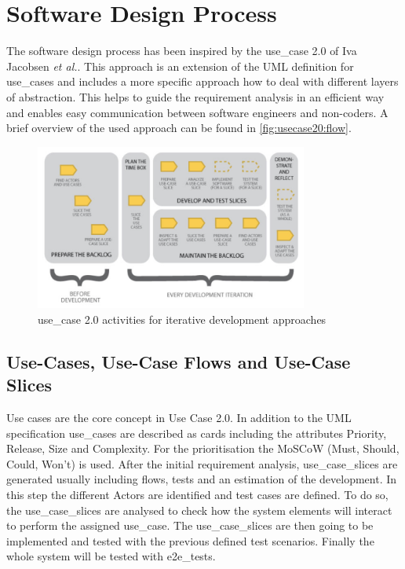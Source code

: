 \section{Software Design Process}
\label{sec:design}

The software design process has been inspired by the \gls{use_case} 2.0 \cite{jacobson2011usecase} of Iva Jacobsen \textit{et al.}. This approach is an extension of the \gls{UML} definition for \glspl{use_case} and includes a more specific approach how to deal with different layers of abstraction. This helps to guide the requirement analysis in an efficient way and enables easy communication between software engineers and non-coders. A brief overview of the used approach can be found in \autoref{fig:usecase20:flow}.

\begin{figure}[!ht]
\centering
\includegraphics[width=0.8\textwidth]{figures/uc20_flow}
\caption{\gls{use_case} 2.0 activities for iterative development approaches \cite{jacobson2011usecase}}
\label{fig:usecase20:flow}
\end{figure}


\subsection{Use-Cases, Use-Case Flows and Use-Case Slices}
Use cases are the core concept in Use Case 2.0. In addition to the \gls{UML} specification \glspl{use_case} are described as cards including the attributes Priority, Release, Size and Complexity. For the prioritisation the MoSCoW \cite{moscow} (Must, Should, Could, Won't) is used. After the initial requirement analysis, \glspl{use_case_slice} are generated usually including flows, tests and an estimation of the development. In this step the different \glspl{Actor} are identified and test cases are defined. To do so, the \glspl{use_case_slice} are analysed to check how the system elements will interact to perform the assigned \gls{use_case}. The \glspl{use_case_slice} are then going to be implemented and tested with the previous defined test scenarios. Finally the whole system will be tested with \glspl{e2e_test}.

